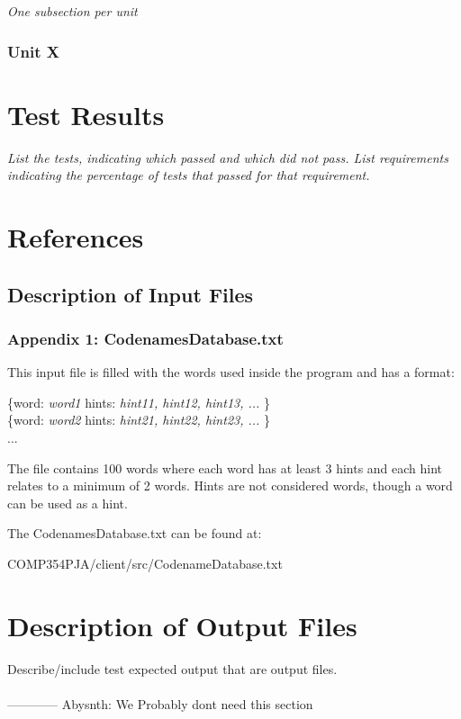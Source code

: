 \documentclass[12pt]{article}
\begin{document}
{\it
One subsection per unit
}

\subsubsection{Unit X}

\section{Test Results}

{\it
List the tests, indicating which passed and which did not pass.
List requirements indicating the percentage of tests that passed for that requirement.
}

\section{References}

\subsection{Description of Input Files}

\subsubsection{Appendix 1: CodenamesDatabase.txt}

This input file is filled with the words used inside the program and has a format:
\begin{center}
\{word: {\it word1} hints: {\it hint11, hint12, hint13, ...} \}\\
\{word: {\it word2} hints: {\it hint21, hint22, hint23, ...} \}\\...
\end{center}
The file contains 100 words where each word has at least 3 hints and each hint relates to a minimum of 2 words. Hints are not considered words, though a word can be used as a hint.

The CodenamesDatabase.txt can be found at: \\
\begin{center}
COMP354PJA/client/src/CodenameDatabase.txt
\end{center}

\section{Description of Output Files}

Describe/include test expected output that are output files.
\\\\
------------\- Abysnth: We Probably dont need this section
\end{document}
